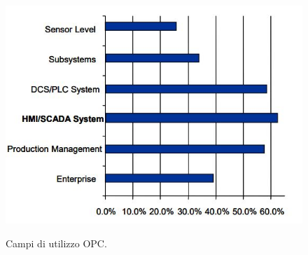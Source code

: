 \documentclass[12pt, a4paper, oneside]{book}
\begin{document}
\begin{figure}[H]
	\centering
	\includegraphics[width=13cm]{Immagini/OPC}
	\label{1}
	\caption{Campi di utilizzo OPC.}
\end{figure}
\end{document}
